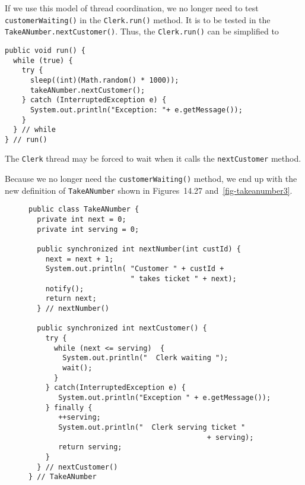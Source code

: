 If we use this model of thread coordination, we no longer need to test
{\tt customerWaiting()} in the {\tt Clerk.run()} method.  It is
to be tested in the {\tt TakeANumber.nextCustomer()}. Thus,
the {\tt Clerk.run()} can be simplified to

\begin{jjjlisting}
\begin{lstlisting}
public void run() {
  while (true) {
    try {
      sleep((int)(Math.random() * 1000));
      takeANumber.nextCustomer();
    } catch (InterruptedException e) {
      System.out.println("Exception: "+ e.getMessage());
    }
  } // while
} // run()
\end{lstlisting}
\end{jjjlisting}

\noindent The {\tt Clerk} thread may be forced to wait
when it calls the {\tt nextCustomer} method.


Because we no longer need the {\tt customerWaiting()} method, we end
up with the new definition of {\tt TakeANumber} shown in
Figures~14.27 and~\ref{fig-takeanumber3}.  

\begin{figure}[h]
\jjjprogstart
\begin{jjjlisting}
\begin{lstlisting}
public class TakeANumber {
  private int next = 0;
  private int serving = 0;

  public synchronized int nextNumber(int custId) {
    next = next + 1;
    System.out.println( "Customer " + custId + 
                        " takes ticket " + next);
    notify();
    return next;
  } // nextNumber()

  public synchronized int nextCustomer() {
    try {
      while (next <= serving)  {
        System.out.println("  Clerk waiting ");
        wait();
      }
    } catch(InterruptedException e) {
       System.out.println("Exception " + e.getMessage());
    } finally {
       ++serving;
       System.out.println("  Clerk serving ticket " 
                                          + serving);
       return serving;
    }
  } // nextCustomer()
} // TakeANumber
\end{lstlisting}
\end{jjjlisting}
\end{figure}

